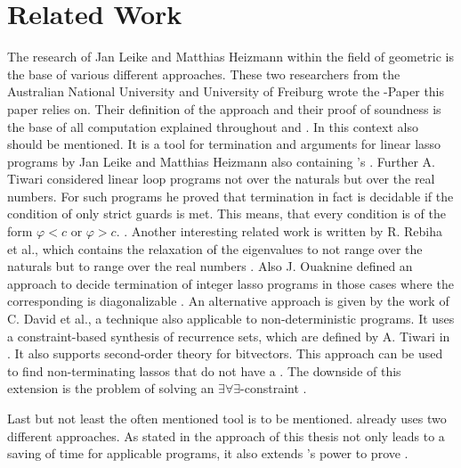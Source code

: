 \chapter{Related Work}
\label{chapter:related-work}

The research of Jan Leike and Matthias Heizmann within the field of geometric \nonterm is the base of various different approaches. These two researchers from the Australian National University and University of Freiburg wrote the \gna-Paper this paper relies on. Their definition of the \gna approach and their proof of soundness is the base of all computation explained throughout  and   \cite{leike2014geometric}. \newline
In this context also  should be mentioned. It is a tool for termination and \nonterm arguments for linear lasso programs by Jan Leike and Matthias Heizmann also containing \gna's  \cite{LassoRanker}.\newline
Further A. Tiwari considered linear loop programs not over the naturals but over the real numbers. For such programs he proved that termination in fact is decidable if the condition of only strict guards is met. This means, that every condition is of the form $\varphi < c$ or $\varphi > c$. \cite{tiwari2004termination}. \newline
Another interesting related work is written by R. Rebiha et al., which contains the relaxation of the eigenvalues to not range over the naturals but to range over the real numbers \cite{rebiha2014characterization}. Also J. Ouaknine defined an approach to decide termination of integer lasso programs in those cases where the corresponding \updatematrix is diagonalizable \cite{ouaknine2014termination}. \newline
An alternative \nonterm approach is given by the work of C. David et al., a technique also applicable to non-deterministic programs. It uses a constraint-based synthesis of recurrence sets, which are defined by A. Tiwari in \cite{tiwari2004termination}. It also supports second-order theory for bitvectors. This approach can be used to find non-terminating lassos that do not have a \gna. The downside of this extension is the problem of solving an $\exists\forall\exists$-constraint \cite{david2015unrestricted} \cite{leike2014geometric}.

Last but not least the often mentioned tool \aprove is to be mentioned. \aprove already uses two different \nonterm approaches. \cite{tacas} 
As stated in  the approach of this thesis not only leads to a saving of time for applicable programs, it also extends \aprove's power to prove \nonterm. 